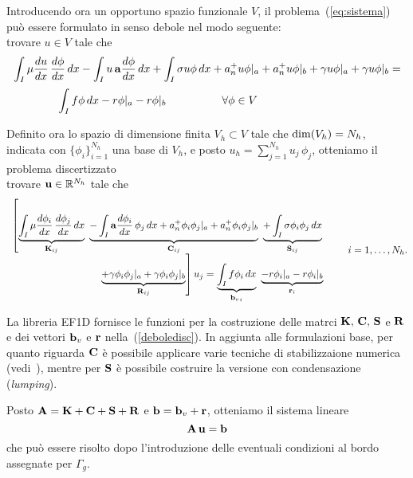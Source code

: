 \documentclass[11pt]{article}
\begin{document}
Introducendo ora un opportuno spazio funzionale $V$, il
problema~(\ref{eq:sistema}) pu\`o essere formulato in senso debole nel
modo seguente: \\
trovare $u \in V$ tale che
\begin{equation}
\label{debole}
\begin{array}{l}
\displaystyle
\int_I \mu \frac{du}{dx} \, \frac{d\phi}{dx} \,dx -
\int_I u \, {\bf a} \frac{d\phi}{dx} \,dx +
\int_I \sigma u  \phi \,dx +
 a_n^+ u \phi|_a + a_n^+ u \phi|_b +
 \gamma u \phi|_a + \gamma u \phi|_b = \\[4mm]
\displaystyle
\qquad \qquad\int_I f\phi \,dx -
 r \phi|_a -r\phi|_b \quad \qquad \qquad\forall \phi \in V
\end{array}
\end{equation}

Definito ora lo spazio di dimensione finita $V_h \subset V$ tale che
${\rm dim}(V_h)=N_h$, indicata con $\{\phi_i \}_{i=1}^{N_h}$ una base
di $V_h$, e posto $u_h = \sum_{j=1}^{N_h}u_j\,\phi_j$, otteniamo il
problema discertizzato\\
trovare ${\bf u}\in \mathbb{R}^{N_h}$ tale che
\begin{equation}
\label{deboledisc}
\begin{array}{r}
\left[ 
\underbrace{\int_I \mu \frac{d\phi_i}{dx} \, \frac{d\phi_j}{dx} \,dx
           }_{{\bf K}_{ij}} \, \,
\underbrace{-\int_I {\bf a} \frac{d\phi_i}{dx} \, \phi_j \, dx
            + a_n^+ \phi_i \phi_j|_a + a_n^+ \phi_i \phi_j|_b 
	   }_{{\bf C}_{ij}}\, \, 
\underbrace{+\int_I \sigma \phi_i  \phi_j \,dx 
           }_{{\bf S}_{ij}} \right .\\[2mm]
\qquad \left.
\underbrace{+ \gamma \phi_i \phi_j|_a + \gamma \phi_i \phi_j|_b
           }_{{\bf R}_{ij}}
\right] u_j =  
\underbrace{\int_I f\phi_i \,dx }_{{{\bf b}_v}_{i}} \, \,
\underbrace{- r \phi_i|_a -r \phi_i|_b}_{{\bf r}_{i}}
\end{array}
\qquad i = 1, \hdots, N_h.
\end{equation}

La libreria EF1D fornisce le funzioni per la costruzione delle matrci 
${\bf K}, \, {\bf C}, \,{\bf S}$ e ${\bf R}$ e dei vettori ${\bf b}_v$ e
${\bf r}$ nella~(\ref{deboledisc}). 
In aggiunta alle formulazioni base, per quanto riguarda ${\bf C}$ \`e 
possibile applicare varie tecniche di stabilizzaione numerica 
(vedi~\cite{Quarteroni}), mentre per ${\bf S}$ \`e possibile costruire 
la versione con condensazione ({\em lumping}).

Posto ${\bf A}={\bf K} + {\bf C} + {\bf S} + {\bf R}$ e
${\bf b}={\bf b}_v + {\bf r}$, otteniamo il sistema lineare
\begin{equation}
\label{sistAub}
{\bf A}\,{\bf u} = {\bf b}
\end{equation}
che pu\`o essere risolto dopo l'introduzione delle eventuali condizioni
al bordo assegnate per $\Gamma_g$.
\end{document}
